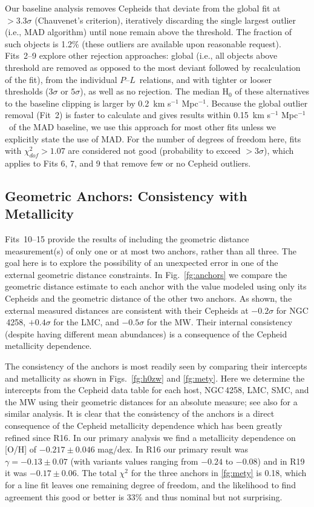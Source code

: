 \documentclass[12pt]{aastex631}
\newcommand{\kms}{km s$^{-1}$ Mpc$^{-1}$}
\newcommand{\kmss }{km s$^{-1}$ Mpc$^{-1}$\ }
\newcommand{\gammabase}{$ -0.217 \pm 0.046$ mag/dex}
\newcommand{\PLs}{$P$--$L$\ }
\begin{document}
Our baseline analysis removes Cepheids that deviate from the global fit at $>3.3\sigma$ (Chauvenet's criterion), iteratively discarding the single largest outlier (i.e., MAD algorithm) until none remain above the threshold.  The fraction of such objects is 1.2\% (these outliers are available upon reasonable request). Fits~2--9 explore other rejection approaches: global (i.e., all objects above threshold are removed as opposed to the most deviant followed by recalculation of the fit), from the individual \PLs relations, and with tighter or looser thresholds ($3\sigma$ or $5\sigma$), as well as no rejection. The median H$_0$ of these alternatives to the baseline clipping is larger by 0.2~\kms. Because the global outlier removal (Fit~2) is faster to calculate and gives results within 0.15~\kmss of the MAD baseline, we use this approach for most other fits unless we explicitly state the use of MAD.  For the number of degrees of freedom here, fits with $\chi^2_{dof}>1.07$ are considered not good (probability to exceed $>3 \sigma$), which applies to Fits 6, 7, and 9 that remove few or no Cepheid outliers.  

\subsection{Geometric Anchors:  Consistency with Metallicity\label{sc:6.2}}
  
Fits~10--15 provide the results of including the geometric distance measurement(s) of only one or at most two anchors,  rather than all three.  The goal here is to explore the possibility of an unexpected error in one of the external geometric distance constraints. In Fig.~\ref{fg:anchors} we compare the geometric distance estimate to each anchor with the value modeled using only its Cepheids and the geometric distance of the other two anchors.  As shown, the external measured distances are consistent with their Cepheids at $-0.2\sigma$ for NGC$\,$4258, $+0.4\sigma$ for the LMC, and $-0.5\sigma$ for the MW.  Their internal consistency (despite having different mean abundances) is a consequence of the Cepheid metallicity dependence.   

The consistency of the anchors is most readily seen by comparing their intercepts and metallicity as shown in Figs.~\ref{fg:h0zw} and \ref{fg:mety}.  Here we determine the intercepts from the Cepheid data table for each host, NGC$\,$4258, LMC, SMC, and the MW using their geometric distances for an absolute measure; see also \citet{Breuval:2021} for a similar analysis.  It is clear that the consistency of the anchors is a direct consequence of the Cepheid metallicity dependence which has been greatly refined since R16.  In our primary analysis we find a metallicity dependence on [O/H] of \gammabase.  In R16 our primary result was $\gamma = -0.13\pm 0.07$ (with variants values ranging from $-0.24$ to $-0.08$) and in R19 it was $-0.17\pm0.06$.   The total $\chi^2$ for the three anchors in \ref{fg:mety} is 0.18, which for a line fit leaves one remaining degree of freedom, and the likelihood to find agreement this good or better is 33\% and thus nominal but not surprising.
\end{document}
